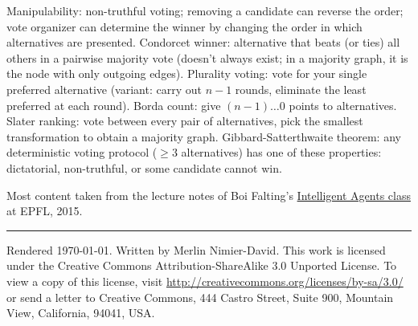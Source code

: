 \documentclass[10pt,a4paper,landscape]{article}
\newcommand{\concept}[1]{\textcolor{Emerald}{#1}} %
\renewcommand{\section}[1]{
    \vspace{-0.3cm}
    \begin{center}
      \color{Bittersweet}
      \hrulefill{\small~~#1~~}\hrulefill
    \end{center}
    \vspace{-0.3cm}
  }
\renewcommand{\subsection}[1]{\section{#1}}
\begin{document}
\begin{multicols*}{4}
\subsection{Voting protocols}

\concept{Manipulability}: non-truthful voting; removing a candidate can reverse the order; vote organizer can determine the winner by changing the order in which alternatives are presented.
\concept{Condorcet winner}: alternative that beats (or ties) all others in a pairwise majority vote (doesn't always exist; in a majority graph, it is the node with only outgoing edges).
\concept{Plurality voting}: vote for your single preferred alternative (variant: carry out $n - 1$ rounds, eliminate the least preferred at each round).
\concept{Borda count}: give $(n - 1) \dots 0$ points to alternatives.
\concept{Slater ranking}: vote between every pair of alternatives, pick the smallest transformation to obtain a majority graph.
\concept{Gibbard-Satterthwaite theorem}: any deterministic voting protocol ($\geq 3$ alternatives) has one of these properties: dictatorial, non-truthful, or some candidate cannot win.

\newpage



\section{Credits}
Most content taken from the lecture notes of Boi Falting's \href{http://edu.epfl.ch/coursebook/en/intelligent-agents-CS-430}{Intelligent Agents class} at EPFL, 2015.

\vspace{0.5cm}
\hrule
\vspace{0.5cm}
\tiny
Rendered \today. Written by Merlin Nimier-David.
This work is licensed under the Creative Commons Attribution-ShareAlike 3.0 Unported License.
To view a copy of this license, visit \href{http://creativecommons.org/licenses/by-sa/3.0/}{http://creativecommons.org/licenses/by-sa/3.0/} or
send a letter to Creative Commons, 444 Castro Street, Suite 900, Mountain View, California, 94041, USA.
\end{multicols*}
\end{document}
